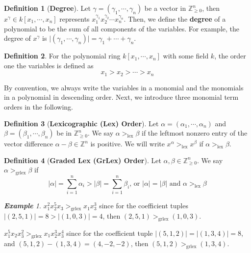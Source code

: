 \documentclass{article}
\newcommand{\lex}{\ensuremath{\operatorname{lex}}}
\newcommand{\grlex}{\ensuremath{\operatorname{grlex}}}
\theoremstyle{definition}
\newtheorem{definition}{Definition}[section]
\theoremstyle{remark}
\theoremstyle{example}
\newtheorem{example}{\textbf{Example}}[section]
\begin{document}
\begin{definition}[\textbf{Degree}]
    Let $\gamma = (\gamma_1,\cdots, \gamma_n)$ be a vector in $\mathbb{Z}_{\geq 0}^n$, then $x^{\gamma} \in k[x_1,\cdots,x_n]$ represents $x_1^{\gamma_1}x_2^{\gamma_2}\cdots x_n^{\gamma_n}$. Then, we define the \textbf{degree} of a polynomial to be the sum of all components of the variables. For example, the degree of $x^{\gamma}$ is $\lvert (\gamma_1, \cdots, \gamma_n) \rvert = \gamma_1 + \cdots + \gamma_n$.
\end{definition}

\begin{definition}
    For the polynomial ring $k[x_1,\cdots, x_n]$ with some field $k$, the order one the variables is defined as
    \begin{equation}
        x_1 > x_2 > \cdots > x_n
    \end{equation}
\end{definition}

By convention, we always write the variables in a monomial and the monomials in a polynomial in descending order.  Next, we introduce three monomial term orders in the following.

\begin{definition}[\textbf{Lexicographic (Lex) Order}]
    Let $\alpha = (\alpha_1, \cdots, \alpha_n)$ and $\beta = (\beta_1,\cdots,\beta_n)$ be in $\mathbb{Z}_{\geq 0}^{n}$. We say $\alpha >_{\lex} \beta$ if the leftmost nonzero entry of the vector difference $\alpha - \beta \in \mathbb{Z}^n$ is positive. We will write $x^{\alpha} >_{\lex} x^{\beta}$ if $\alpha >_{\lex} \beta$.
\end{definition}

\begin{definition}[\textbf{Graded Lex (GrLex) Order}]
    Let $\alpha,\beta \in \mathbb{Z}_{\geq 0}^{n}$. We say $\alpha >_{\grlex} \beta$ if
    \begin{equation}
        \lvert \alpha \rvert = \sum_{i = 1}^{n}{\alpha_i} > \lvert \beta \rvert = \sum_{i = 1}^{n}{\beta_i} \text{, or } \lvert \alpha \rvert = \lvert \beta \rvert \text{ and } \alpha >_{\lex} \beta
    \end{equation}
\end{definition}

\begin{example}
    $x_{1}^2x_{2}^{5}x_{3} >_{\grlex} {x_{1}}x_3^{3}$ since for the coefficient tuples $\lvert (2,5,1) \rvert = 8 > \lvert (1,0,3) \rvert = 4$, then $(2,5,1) >_{\grlex} (1,0,3)$. 
    
    $x_1^5x_2x_3^2 >_{\grlex} x_1x_2^{3}x_3^4$ since for the coefficient tuple $\lvert (5,1,2) \rvert = \lvert (1,3,4) \rvert = 8$, and $(5,1,2) - (1,3,4) = (4,-2,-2)$, then $(5,1,2) >_{\grlex} (1,3,4)$.
\end{example}
\end{document}
